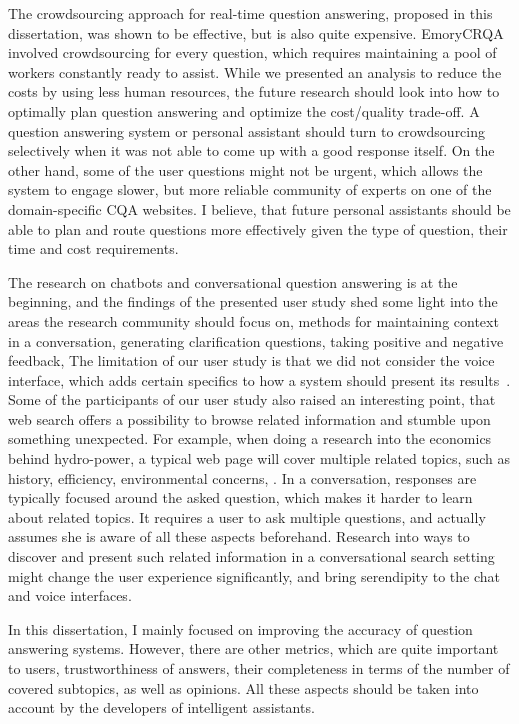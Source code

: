 The crowdsourcing approach for real-time question answering, proposed in this dissertation, was shown to be effective, but is also quite expensive.
EmoryCRQA involved crowdsourcing for every question, which requires maintaining a pool of workers constantly ready to assist.
While we presented an analysis to reduce the costs by using less human resources, the future research should look into how to optimally plan question answering and optimize the cost/quality trade-off.
A question answering system or personal assistant should turn to crowdsourcing selectively when it was not able to come up with a good response itself.
On the other hand, some of the user questions might not be urgent, which allows the system to engage slower, but more reliable community of experts on one of the domain-specific CQA websites.
I believe, that future personal assistants should be able to plan and route questions more effectively given the type of question, their time and cost requirements.

The research on chatbots and conversational question answering is at the beginning, and the findings of the presented user study shed some light into the areas the research community should focus on, \eg methods for maintaining context in a conversation, generating clarification questions, taking positive and negative feedback, \etc
The limitation of our user study is that we did not consider the voice interface, which adds certain specifics to how a system should present its results~\cite{trippas2015results}.
Some of the participants of our user study also raised an interesting point, that web search offers a possibility to browse related information and stumble upon something unexpected.
For example, when doing a research into the economics behind hydro-power, a typical web page will cover multiple related topics, such as history, efficiency, environmental concerns, \etc. 
In a conversation, responses are typically focused around the asked question, which makes it harder to learn about related topics.
It requires a user to ask multiple questions, and actually assumes she is aware of all these aspects beforehand.
Research into ways to discover and present such related information in a conversational search setting might change the user experience significantly, and bring serendipity to the chat and voice interfaces.

In this dissertation, I mainly focused on improving the accuracy of question answering systems.
However, there are other metrics, which are quite important to users, \eg trustworthiness of answers, their completeness in terms of the number of covered subtopics, as well as opinions.
All these aspects should be taken into account by the developers of intelligent assistants.

